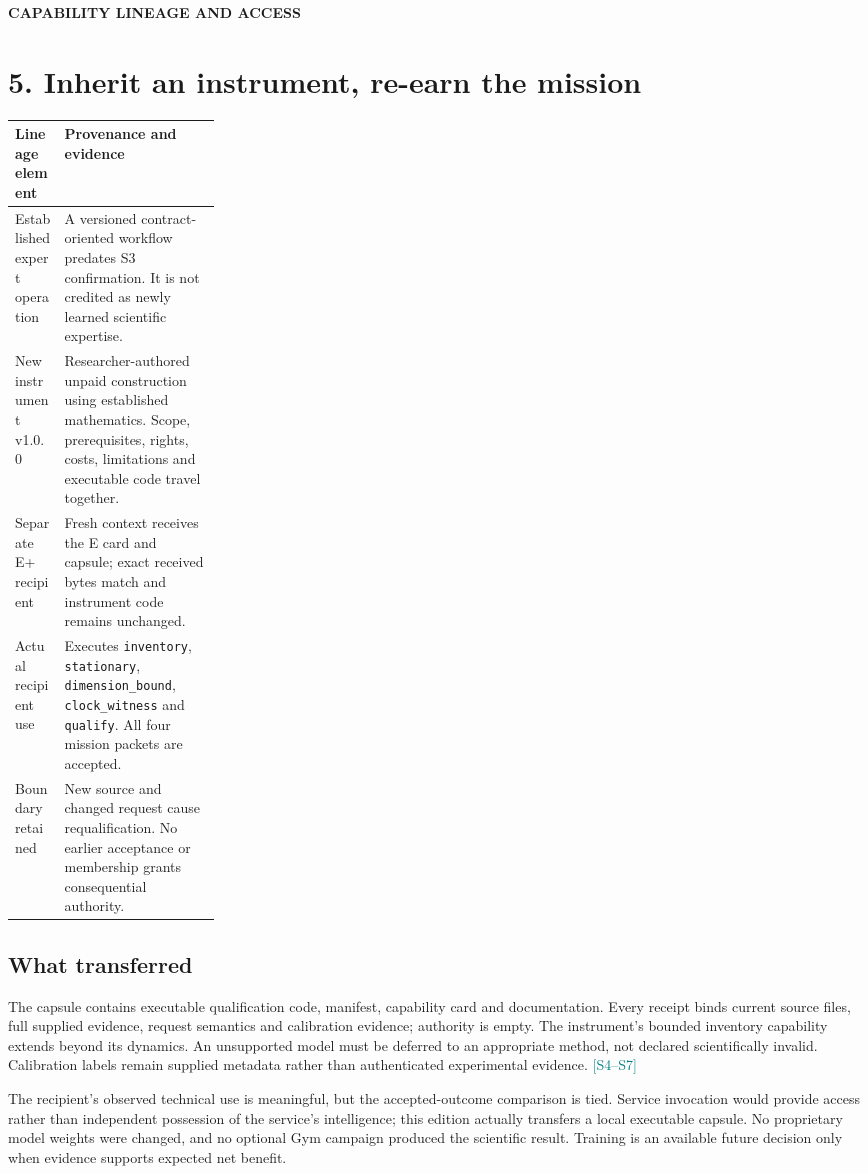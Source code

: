 \documentclass[10pt,letterpaper]{article}
\newcommand{\src}[1]{\textcolor{Teal}{\scriptsize[#1]}}
\newcommand{\eyebrow}[1]{{\small\bfseries\color{Gold}\MakeUppercase{#1}}\par}
\newcommand{\pagename}[2]{\eyebrow{#1}\section*{#2}}
\begin{document}
\newpage
\pagename{Capability lineage and access}{5. Inherit an instrument, re-earn the mission}
\begin{tabularx}{\linewidth}{@{}L{0.24\linewidth}Y@{}}
\toprule
\textbf{Lineage element} & \textbf{Provenance and evidence} \\
\midrule
Established expert operation & A versioned contract-oriented workflow predates S3 confirmation. It is not credited as newly learned scientific expertise. \\
New instrument v1.0.0 & Researcher-authored unpaid construction using established mathematics. Scope, prerequisites, rights, costs, limitations and executable code travel together. \\
Separate E+ recipient & Fresh context receives the E card and capsule; exact received bytes match and instrument code remains unchanged. \\
Actual recipient use & Executes \texttt{inventory}, \texttt{stationary}, \texttt{dimension\_bound}, \texttt{clock\_witness} and \texttt{qualify}. All four mission packets are accepted. \\
Boundary retained & New source and changed request cause requalification. No earlier acceptance or membership grants consequential authority. \\
\bottomrule
\end{tabularx}

\subsection*{What transferred}
The capsule contains executable qualification code, manifest, capability card and documentation. Every receipt binds current source files, full supplied evidence, request semantics and calibration evidence; authority is empty. The instrument's bounded inventory capability extends beyond its dynamics. An unsupported model must be deferred to an appropriate method, not declared scientifically invalid. Calibration labels remain supplied metadata rather than authenticated experimental evidence. \src{S4--S7}

The recipient's observed technical use is meaningful, but the accepted-outcome comparison is tied. Service invocation would provide access rather than independent possession of the service's intelligence; this edition actually transfers a local executable capsule. No proprietary model weights were changed, and no optional Gym campaign produced the scientific result. Training is an available future decision only when evidence supports expected net benefit.
\end{document}
